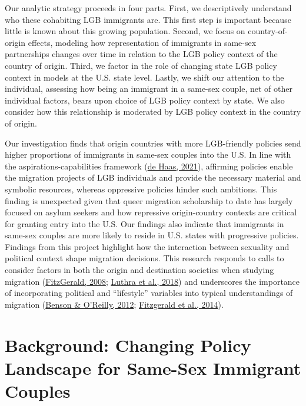 \documentclass[
  11pt,
]{article}
\begin{document}
Our analytic strategy proceeds in four parts. First, we descriptively understand who these cohabiting LGB immigrants are. This first step is important because little is known about this growing population. Second, we focus on country-of-origin effects, modeling how representation of immigrants in same-sex partnerships changes over time in relation to the LGB policy context of the country of origin. Third, we factor in the role of changing state LGB policy context in models at the U.S. state level. Lastly, we shift our attention to the individual, assessing how being an immigrant in a same-sex couple, net of other individual factors, bears upon choice of LGB policy context by state. We also consider how this relationship is moderated by LGB policy context in the country of origin.

Our investigation finds that origin countries with more LGB-friendly policies send higher proportions of immigrants in same-sex couples into the U.S. In line with the aspirations-capabilities framework (\protect\hyperlink{ref-dehaas_2021}{de Haas, 2021}), affirming policies enable the migration projects of LGB individuals and provide the necessary material and symbolic resources, whereas oppressive policies hinder such ambitions. This finding is unexpected given that queer migration scholarship to date has largely focused on asylum seekers and how repressive origin-country contexts are critical for granting entry into the U.S. Our findings also indicate that immigrants in same-sex couples are more likely to reside in U.S. states with progressive policies.
Findings from this project highlight how the interaction between sexuality and political context shape migration decisions. This research responds to calls to consider factors in both the origin and destination societies when studying migration (\protect\hyperlink{ref-fitzgerald_2008}{FitzGerald, 2008}; \protect\hyperlink{ref-luthra_2018}{Luthra et al., 2018}) and underscores the importance of incorporating political and ``lifestyle'' variables into typical understandings of migration (\protect\hyperlink{ref-benson_2012}{Benson \& O'Reilly, 2012}; \protect\hyperlink{ref-fitzgerald_2014}{Fitzgerald et al., 2014}).

\hypertarget{background-changing-policy-landscape-for-same-sex-immigrant-couples}{%
\section{Background: Changing Policy Landscape for Same-Sex Immigrant Couples}\label{background-changing-policy-landscape-for-same-sex-immigrant-couples}}
\end{document}
